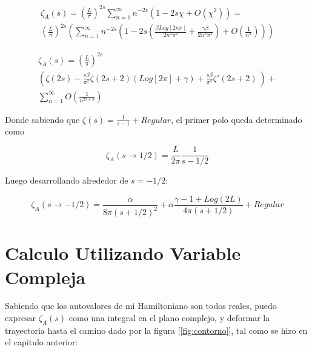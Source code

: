 \begin{equation}
\begin{array}{c}
    \zeta _A (s) = ( \frac{L}{\pi} ) ^{2 s}
    \sum _{n=1} ^{\infty} 
    n ^{-2s}
    \left(
    1 - 2 s \chi + O(\chi ^2)
    \right) =  \\
    ( \frac{L}{\pi} ) ^{2 s}
    \left(
    \sum _{n=1} ^{\infty} n ^{-2 s} 
    \left(
    1 - 2s \left(
    \frac{\beta Log[2 n \pi]}{2 n ^2 \pi ^2} + 
    \frac{\gamma \beta}{2 n ^2 \pi ^2} 
	\right) +
    O (\frac{1}{n ^{3} }  )
    \right)
    \right)
\end{array}
\end{equation}


\begin{equation}
\begin{array}{c}
    \zeta _A (s) = 
    \left( \frac{L }{ \pi } \right) ^{2 s}  \\
    \left(
    \zeta (2 s) -
	\frac{ s \beta}{ \pi ^2} \zeta (2s+2)
	\left(
	   Log[2  \pi ] + \gamma
	\right) +
    \frac{s \beta}{\pi ^2}
	\zeta '(2s+2) \
	\right) + \\
    \sum _{n=1} ^{\infty} O \left( \frac{1}{n ^{2s+3}} \right)
\end{array}
\end{equation}

Donde sabiendo que $\zeta(s) = \frac{1}{s-1} + Regular$, el primer polo queda determinado como

\begin{equation}
    \zeta _A (s \rightarrow 1/2) = \frac{L}{2 \pi} \frac{1}{s-1/2}    
\end{equation}

Luego desarrollando alrededor de $s=-1/2$:

\begin{equation}
    \zeta _A (s \rightarrow -1/2 ) =  \frac{\alpha}{8  \pi (s+1/2)^2} +
    \alpha \frac{ \gamma -1 + Log(2L )}{4  \pi (s+1/2)} + 
    Regular
\end{equation}

\section{Calculo Utilizando Variable Compleja}


Sabiendo que los autovalores de mi Hamiltoniano son todos reales, puedo expresar $\zeta _A (s)$ como una integral en el plano complejo, y deformar la trayectoria hasta el camino dado por la figura [\ref{fig:contorno}], tal como se hizo en el capitulo anterior: \\

